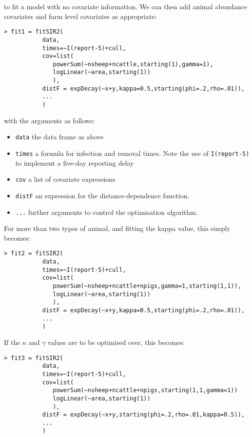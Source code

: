 \documentclass{article}
\begin{document}
to fit a model with no covariate information. We can then add animal abundance covariates and
farm level covariates as appropriate:

\begin{verbatim}
> fit1 = fitSIR2(
           data,
           times=~I(report-5)+cull,
           cov=list(
              powerSum(~nsheep+ncattle,starting(1),gamma=1),
              logLinear(~area,starting(1))
              ),
           distF = expDecay(~x+y,kappa=0.5,starting(phi=.2,rho=.01)),
           ...
           )
\end{verbatim}

with the arguments as follows:

\begin{itemize}
\item {\tt data} the data frame as above
\item {\tt times} a formula for infection and removal times. Note the use of {\tt I(report-5)} to implement a 
five-day reporting delay
\item {\tt cov} a list of covariate expressions
\item {\tt distF} an expression for the distance-dependence function.
\item {\tt ...} further arguments to control the optimisation algorithm.
\end{itemize}

For more than two types of animal, and fitting the kappa value, this simply becomes:

\begin{verbatim}
> fit2 = fitSIR2(
           data,
           times=~I(report-5)+cull,
           cov=list(
              powerSum(~nsheep+ncattle+npigs,gamma=1,starting(1,1)),
              logLinear(~area,starting(1))
              ),
           distF = expDecay(~x+y,kappa=0.5,starting(phi=.2,rho=.01)),
           ...
           )
\end{verbatim}

If the $\kappa$ and $\gamma$ values are to be optimised over, this becomes:

\begin{verbatim}
> fit3 = fitSIR2(
           data,
           times=~I(report-5)+cull,
           cov=list(
              powerSum(~nsheep+ncattle+npigs,starting(1,1,gamma=1))
              logLinear(~area,starting(1))
              ),
           distF = expDecay(~x+y,starting(phi=.2,rho=.01,kappa=0.5)),
           ...
           )
\end{verbatim}
\end{document}
